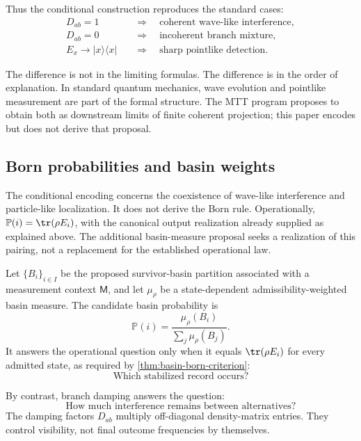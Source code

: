 \documentclass[11pt]{article}
\newcommand{\Meas}{\mathsf M}
\begin{document}
Thus the conditional construction reproduces the standard cases:
\begin{align}
  D_{ab}=1
  &\quad\Longrightarrow\quad
  \text{coherent wave-like interference},
  \\
  D_{ab}=0
  &\quad\Longrightarrow\quad
  \text{incoherent branch mixture},
  \\
  E_x\to |x\rangle\langle x|
  &\quad\Longrightarrow\quad
  \text{sharp pointlike detection}.
\end{align}

The difference is not in the limiting formulas. The difference is in the order of explanation.
In standard quantum mechanics, wave evolution and pointlike measurement are part of the
formal structure. The MTT program proposes to obtain both as downstream limits of finite
coherent projection; this paper encodes but does not derive that proposal.

\subsection{Born probabilities and basin weights}
\label{subsec:born-basin-weights}

The conditional encoding concerns the coexistence of wave-like interference and
particle-like localization. It does not derive the Born rule. Operationally,
\(\mathbb P(i)=\tr(\rho E_i)\), with the canonical output realization already supplied
as explained above. The additional basin-measure proposal seeks a realization of this
pairing, not a replacement for the established operational law.

Let \(\{B_i\}_{i\in I}\) be the proposed survivor-basin partition associated with a
measurement context \(\Meas\), and let \(\mu_\rho\) be a state-dependent
admissibility-weighted basin measure. The candidate basin probability is
\begin{equation}
  \mathbb P(i)
  =
  \frac{\mu_\rho(B_i)}{\sum_j\mu_\rho(B_j)}.
  \label{eq:born-basin-probability-existing}
\end{equation}
It answers the operational question only when it equals \(\tr(\rho E_i)\) for every admitted
state, as required by \cref{thm:basin-born-criterion}:
\begin{equation}
  \text{Which stabilized record occurs?}
\end{equation}

By contrast, branch damping answers the question:
\begin{equation}
  \text{How much interference remains between alternatives?}
\end{equation}
The damping factors \(D_{ab}\) multiply off-diagonal density-matrix entries. They control
visibility, not final outcome frequencies by themselves.
\end{document}
